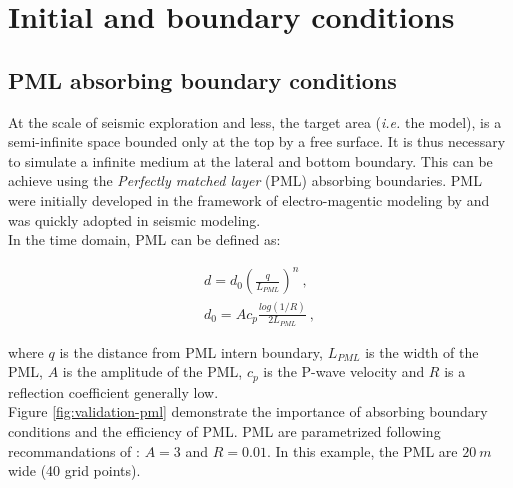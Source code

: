\documentclass{gnulike}
\begin{document}
\section{Initial and boundary conditions}

\subsection{PML absorbing boundary conditions}

\noindent At the scale of seismic exploration and less, the target area (\textit{i.e.} the model), is a semi-infinite space bounded only at the top by a free surface. It is thus necessary to simulate a infinite medium at the lateral and bottom boundary. This can be achieve using the \textit{Perfectly matched layer} (PML) absorbing boundaries. PML were initially developed in the framework of electro-magentic modeling by \cite{berenger1994perfectly} and was quickly adopted in seismic modeling.\\

\noindent In the time domain, PML can be defined as:

\begin{eqnarray}
\label{eq:pml-equations}
d = d_{0} \left( \frac{q}{L_{PML}} \right) ^{n}\ , \\
d_{0} = Ac_{p} \frac{log(1/R)}{2L_{PML}}\ ,
\end{eqnarray}

\noindent where $q$ is the distance from PML intern boundary, $L_{PML}$ is the width of the PML, $A$ is the amplitude of the PML, $c_{p}$ is the P-wave velocity and $R$ is a reflection coefficient generally low.\\

\noindent Figure \ref{fig:validation-pml} demonstrate the importance of absorbing boundary conditions and the efficiency of PML. PML are parametrized following recommandations of \cite{festa2005newmark}: $A=3$ and $R=0.01$. In this example, the PML are $20\ m$ wide (40 grid points).
\end{document}
